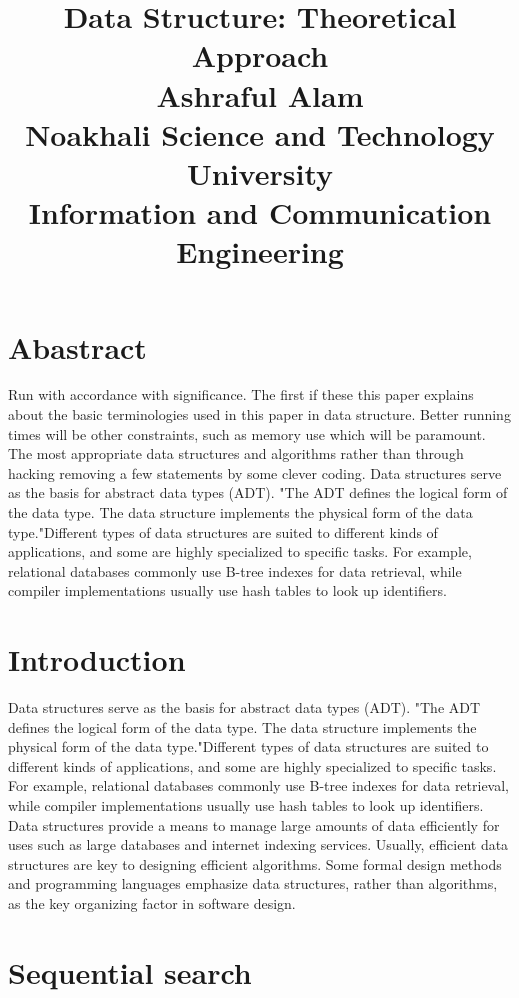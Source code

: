 \documentclass[10pt]{article}
\title{
  Data Structure: Theoretical Approach\\ Ashraful Alam\\ Noakhali Science and Technology University\\ Information and Communication Engineering 
 }
\date{}
\begin{document}
\maketitle
\section{Abastract}

Run  with  accordance  with significance.  The first  if these this paper explains about the basic terminologies used  in  this  paper  in  data structure.  Better  running times will be  other constraints,  such as memory use which will  be paramount.  The most appropriate  data structures and algorithms rather than through hacking removing  a  few  statements  by  some  clever coding. Data  structures  serve  as  the  basis  for  abstract  data types (ADT). "The ADT defines the logical form  of the  data  type.  The  data  structure  implements  the physical form of the data type."Different types of data structures are suited to different kinds of applications, and some are highly specialized to specific tasks. For example,  relational  databases  commonly  use  B-tree indexes  for  data  retrieval,  while  compiler implementations  usually use  hash tables  to  look  up identifiers.




\section{Introduction}

Data  structures  serve  as  the  basis  for  abstract  data types (ADT). "The ADT defines the logical form  of the  data  type.  The  data  structure  implements  the physical form of the data type."Different types of data structures are suited to different kinds of applications, and some are highly specialized to specific tasks. For example,  relational  databases  commonly  use  B-tree indexes  for  data  retrieval,  while  compiler implementations  usually use  hash tables  to look  up identifiers. Data structures provide a means to manage large amounts of data efficiently for uses such as large databases  and  internet  indexing  services.  Usually, efficient data structures are key to designing efficient algorithms.  Some  formal  design  methods  and programming  languages  emphasize  data  structures, rather than algorithms, as the key organizing factor in software  design. 



\section{Sequential search}
\end{document}
